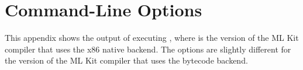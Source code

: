 \documentclass[12pt]{book}
\begin{document}




\appendix

\chapter{Command-Line Options}
\label{kithelp}
This appendix shows the output of executing , where
 is the version of the ML Kit compiler that uses the x86
native backend. The options are slightly different for the version of
the ML Kit compiler that uses the bytecode backend.
\end{document}
